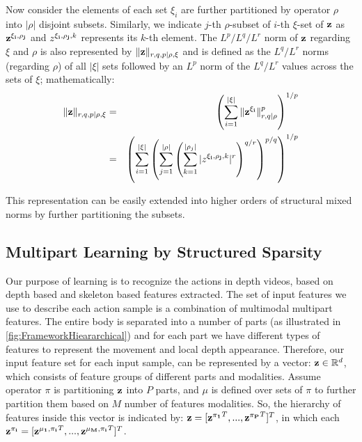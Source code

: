 \documentclass[9pt,technote,compsoc]{IEEEtran}
\begin{document}
Now consider the elements of each set $\xi_i$ are further partitioned by operator $\rho$ into $|\rho|$ disjoint subsets. Similarly, we indicate $j$-th $\rho$-subset of $i$-th $\xi$-set of $\bf z$ as ${\bf z}^{\bf \xi_i,\rho_j}$ and ${z}^{{\bf \xi_i,\rho_j},k}$ represents its $k$-th element. The $L^p/L^q/L^r$ norm of $\bf z$ regarding $\xi$ and $\rho$ is also represented by $\|{\bf z}\|_{r,q,p|\rho,\xi}$ and is defined as the $L^q/L^r$ norms (regarding $\rho$) of all $|\xi|$ sets followed by an $L^p$ norm of the $L^q/L^r$ values across the sets of $\xi$; mathematically:
\begin{eqnarray}
\label{eqn_mixednorm3}\|{\bf z}\|_{r,q,p|\rho,\xi}&=&
\left(\sum_{i=1}^{|\xi|}\|{\bf z^{\xi_i}}\|_{r,q|\rho}^p\right)^{1/p} \nonumber\\
&=&\left(\sum_{i=1}^{|\xi|}
\left(\sum_{j=1}^{|\rho|}{\left(\sum_{k=1}^{|\rho_j|}|z^{{\bf \xi_i,\rho_j},k}|^r\right)}^{q/r}\right)^{p/q}\right)^{1/p}
\end{eqnarray}

This representation can be easily extended into higher orders of structural mixed norms by further partitioning the subsets.


\subsection{Multipart Learning by Structured Sparsity}
\label{sec:MP}
Our purpose of learning is to recognize the actions in depth videos, based on depth based and skeleton based features extracted. The set of input features we use to describe each action sample is a combination of multimodal multipart features. The entire body is separated into a number of parts (as illustrated in \figurename{\ref{fig:FrameworkHieararchical}}) and for each part we have different types of features to represent the movement and local depth appearance. Therefore, our input feature set for each input sample, can be represented by a vector: ${\bf z} \in\mathbb{R}^d$, which consists of feature groups of different parts and modalities. Assume operator $\pi$ is partitioning $\bf z$ into $P$ parts, and $\mu$ is defined over sets of $\pi$ to further partition them based on $M$ number of features modalities. So, the hierarchy of features inside this vector is indicated by: ${\bf z} = [{{\bf z}^{\bf\pi_1}}^T,...,{{\bf z}^{\bf\pi_{P}}}^T]^T$, in which each ${\bf z}^{\bf \pi_i} = [{{\bf z}^{\bf \mu_1,\pi_i}}^T,...,{{\bf z}^{\bf \mu_{M},\pi_i}}^T]^T$.
\end{document}
